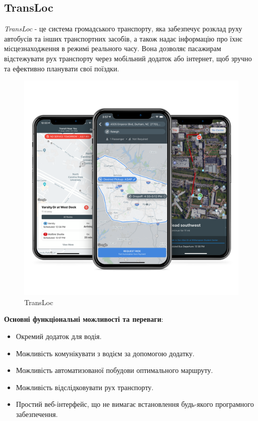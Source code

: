 \documentclass[14pt]{extreport}
\begin{document}
\begin{normalsize}
	\subsection*{TransLoc}
	\textit{TransLoc} - це система громадського транспорту, яка забезпечує розклад руху автобусів та інших транспортних засобів, а також надає інформацію про їхнє місцезнаходження в режимі реального часу. Вона дозволяє пасажирам відстежувати рух транспорту через мобільний додаток або інтернет, щоб зручно та ефективно планувати свої поїздки.
	
	\begin{figure}[H]
		\centering
		\includegraphics[scale=0.45]{4}
		\caption{TransLoc}
	\end{figure}
	
	\textbf{Основні функціональні можливості та переваги}:
	\begin{itemize}
		\item Окремий додаток для водія.
		\item Можливість комунікувати з водієм за допомогою додатку.
		\item Можливість автоматизованої побудови оптимального маршруту.
		\item Можливість відслідковувати рух транспорту.
		\item Простий веб-інтерфейс, що не вимагає встановлення будь-якого програмного забезпечення.
	\end{itemize}
	

\end{normalsize}
\end{document}
